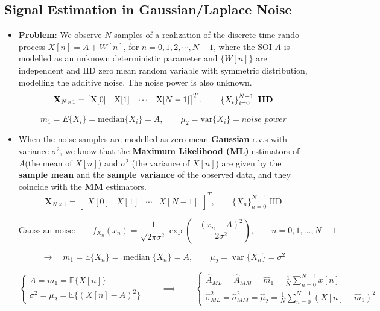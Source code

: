 \subsection{Signal Estimation in Gaussian/Laplace Noise}
\begin{itemize}
    \item \textbf{Problem}: We observe \(N\) samples of a realization of the discrete-time rando process \(X[n]=A+W[n]\), for \(n=0,1,2,\cdots,N-1\), where the SOI \(A\) is modelled as an unknown deterministic parameter and \(\{W[n]\}\) are independent and IID zero mean random variable with symmetric distribution, modelling the additive noise. The noise power is also unknown.
\[
\mathbf{X}_{N \times 1} = 
\begin{bmatrix} 
\mathrm{X}[0] & \mathrm{X}[1] & \cdots & \mathrm{X}[N-1]
\end{bmatrix}^T, 
\qquad 
\left\{ X_i \right\}_{i=0}^{N-1} \ \text{\textbf{IID}}
\]

\[
m_1 = E\{X_i\} = \mathrm{median}\{X_i\} = A, \qquad
\mu_2 = \mathrm{var}\{X_i\} = \textit{noise power}
\]

    \item When the noise samples are modelled as zero mean \textbf{Gaussian} r.v.s with variance \(\sigma^2\), we know that the \textbf{Maximum Likelihood (ML)} estimators of \(A\)(the mean of \(X[n]\)) and \(\sigma^2\) (the variance of \(X[n]\)) are given by the \textbf{sample mean} and the \textbf{sample variance} of the observed data, and they coincide with the \textbf{MM} estimators.
\[
\mathbf{X}_{N \times 1} = \begin{bmatrix} X[0] & X[1] & \cdots & X[N-1] \end{bmatrix}^{T}, \qquad \{ X_n \}_{n=0}^{N-1} \;\text{IID}
\]

\[
\text{Gaussian noise:} \qquad f_{X_n}(x_n) = \frac{1}{\sqrt{2\pi\sigma^2}} \exp \left( -\frac{(x_n - A)^2}{2\sigma^2} \right), \qquad n = 0,1,\ldots,N-1
\]

\[
\rightarrow \quad m_1 = \mathbb{E}\{ X_n \} = \operatorname{median}\{X_n\} = A, \qquad \mu_2 = \operatorname{var}\{ X_n \} = \sigma^2
\]

\[
\left\{
\begin{array}{l}
A = m_1 = \mathbb{E}\{ X[n] \} \\[1ex]
\sigma^2 = \mu_2 = \mathbb{E}\{ ( X[n] - A )^2 \}
\end{array}
\right.
\qquad \implies \qquad
\left\{
\begin{array}{l}
\hat{A}_{ML} = \hat{A}_{MM} = \hat{m}_1 = \frac{1}{N} \sum_{n=0}^{N-1} x[n] \\[2.5ex]
\hat{\sigma}^2_{ML} = \hat{\sigma}^2_{MM} = \hat{\mu}_2 = \frac{1}{N} \sum_{n=0}^{N-1} \left( X[n] - \hat{m}_1 \right)^2
\end{array}
\right.
\]
    

\end{itemize}
